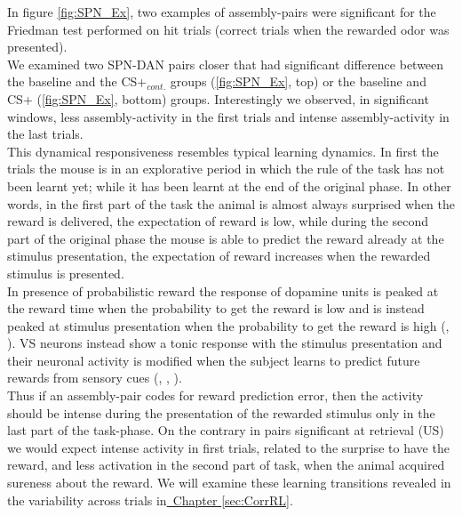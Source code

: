 In figure \ref{fig:SPN_Ex}, two examples of assembly-pairs were significant for the Friedman test performed on hit trials (correct trials when the rewarded odor was presented).\\We examined two SPN-DAN pairs closer that had significant difference between the baseline and the CS+$_{cont.}$ groups (\ref{fig:SPN_Ex}, top) or the baseline and CS+ (\ref{fig:SPN_Ex}, bottom) groups. Interestingly we observed, in significant windows, less assembly-activity in the first trials and intense assembly-activity in the last trials.\\This dynamical responsiveness resembles typical learning dynamics. In first the trials the mouse is in an explorative period in which the rule of the task has not been learnt yet; while it has been learnt at the end of the original phase. In other words, in the first part of the task the animal is almost always surprised when the reward is delivered, the expectation of reward is low, while during the second part of the original phase the mouse is able to predict the reward already at the stimulus presentation, the expectation of reward increases when the rewarded stimulus is presented.\\In presence of probabilistic reward the response of dopamine units is peaked at the reward time when the probability to get the reward is low and is instead peaked at stimulus presentation when the probability to get the reward is high (\cite{Schultz1992}, \cite{Schultz} \cite{Fiorillo}). VS neurons instead show a tonic response with the stimulus presentation and their neuronal activity is modified when the subject learns to predict future rewards from sensory cues (\cite{Pagnoni}, \cite{Schultz2000}, \cite{Radua}).\\Thus if an assembly-pair codes for reward prediction error, then the activity should be intense during the presentation of the rewarded stimulus only in the last part of the task-phase. On the contrary in pairs significant at retrieval (US) we would expect intense activity in first trials, related to the surprise to have the reward, and less activation in the second part of task, when the animal acquired sureness about the reward. We will examine these learning transitions revealed in the variability across trials in\hyperref[sec:CorrRL]{~Chapter \ref*{sec:CorrRL}}.\\
